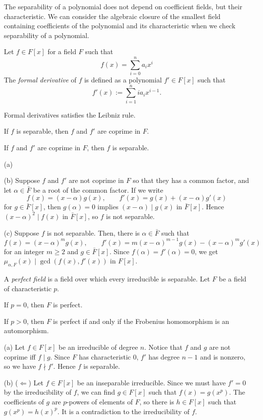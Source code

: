 \documentclass{../note}
\begin{document}
The separability of a polynomial does not depend on coefficient fields, but their characteristic.
We can consider the algebraic closure of the smallest field containing coefficients of the polynomial and its characteristic when we check separability of a polynomial.

\begin{prb}
Let $f\in F[x]$ for a field $F$ such that
\[f(x)=\sum_{i=0}^na_ix^i\]
The \emph{formal derivative} of $f$ is defined as a polynomial $f'\in F[x]$ such that
\[f'(x):=\sum_{i=1}^nia_ix^{i-1}.\]
\begin{parts}
\item Formal derivatives satisfies the Leibniz rule.
\item If $f$ is separable, then $f$ and $f'$ are coprime in $F$.
\item If $f$ and $f'$ are coprime in $F$, then $f$ is separable.
\end{parts}
\end{prb}
\begin{pf}
(a)

(b)
Suppose $f$ and $f'$ are not coprime in $F$ so that they has a common factor, and let $\alpha\in\bar F$ be a root of the common factor.
If we write
\[f(x)=(x-\alpha)g(x),\qquad f'(x)=g(x)+(x-\alpha)g'(x)\]
for $g\in\bar F[x]$, then $g(\alpha)=0$ implies $(x-\alpha)\mid g(x)$ in $\bar F[x]$.
Hence $(x-\alpha)^2\mid f(x)$ in $\bar F[x]$, so $f$ is not separable.

(c)
Suppose $f$ is not separable.
Then, there is $\alpha\in\bar F$ such that
\[f(x)=(x-\alpha)^mg(x),\qquad f'(x)=m(x-\alpha)^{m-1}g(x)-(x-\alpha)^mg'(x)\]
for an integer $m\ge2$ and $g\in\bar F[x]$.
Since $f(\alpha)=f'(\alpha)=0$, we get $\mu_{\alpha,F}(x)\mid\gcd(f(x),f'(x))$ in $F[x]$.
\end{pf}


\begin{prb}
A \emph{perfect field} is a field over which every irreducible is separable.
Let $F$ be a field of characteristic $p$.
\begin{parts}
\item If $p=0$, then $F$ is perfect.
\item If $p>0$, then $F$ is perfect if and only if the Frobenius homomorphism is an automorphism.
\end{parts}
\end{prb}
\begin{pf}
(a)
Let $f\in F[x]$ be an irreducible of degree $n$.
Notice that $f$ and $g$ are not coprime iff $f\mid g$.
Since $F$ has characteristic 0, $f'$ has degree $n-1$ and is nonzero, so we have $f\nmid f'$.
Hence $f$ is separable.

(b)
($\Leftarrow$)
Let $f\in F[x]$ be an inseparable irreducible.
Since we must have $f'=0$ by the irreducibility of $f$, we can find $g\in F[x]$ such that $f(x)=g(x^p)$.
The coefficients of $g$ are $p$-powers of elements of $F$, so there is $h\in F[x]$ such that $g(x^p)=h(x)^p$.
It is a contradiction to the irreducibility of $f$.
\end{pf}
\end{document}
